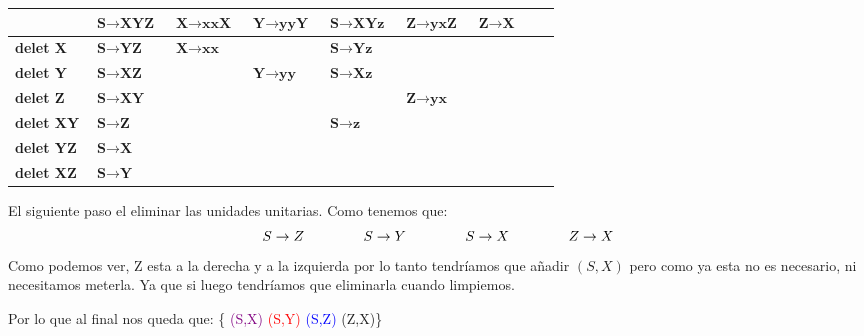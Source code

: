 \begin{table}[H]
	\centering
	\begin{tabular}{|m{2cm}||m{1.8cm}|m{1.8cm}|m{1.8cm}|m{1.8cm}|m{1.8cm}|m{1.8cm}|m{1.8cm}|m{1.8cm}|}
		\hline
		& $ \textbf{S} \rightarrow \textbf{XYZ} $ & $ \textbf{X} \rightarrow \textbf{xxX} $ & $ \textbf{Y} \rightarrow \textbf{yyY} $ & $ \textbf{S} \rightarrow \textbf{XYz} $ & $ \textbf{Z} \rightarrow \textbf{yxZ} $ & $ \textbf{Z} \rightarrow \textbf{X} $ \\
		\hline \hline
		\textbf{delet X} & $ \textbf{S} \rightarrow \textbf{YZ} $ & $ \textbf{X} \rightarrow \textbf{xx} $ &  & $ \textbf{S} \rightarrow \textbf{Yz} $ &  &  \\
		\hline
		\textbf{delet Y} & $ \textbf{S} \rightarrow \textbf{XZ} $ &  & $ \textbf{Y} \rightarrow \textbf{yy} $ & $ \textbf{S} \rightarrow \textbf{Xz} $ &  &  \\
		\hline
		\textbf{delet Z} & $ \textbf{S} \rightarrow \textbf{XY} $ &  &  &  & $ \textbf{Z} \rightarrow \textbf{yx} $ &  \\
		\hline
		\textbf{delet XY} & $ \textbf{S} \rightarrow \textbf{Z} $ &  &  & $ \textbf{S} \rightarrow \textbf{z} $ &  &  \\
		\hline
		\textbf{delet YZ} & $ \textbf{S} \rightarrow \textbf{X} $ &  &  &  &  &  \\
		\hline
		\textbf{delet XZ} & $ \textbf{S} \rightarrow \textbf{Y} $ &  &  &  &  &  \\
		\hline
	\end{tabular}
	\label{fig:tabla-prac-4C}
\end{table}

El siguiente paso el eliminar las unidades unitarias. Como tenemos que: \newline
$$ S \rightarrow Z \hspace{1.5cm} S \rightarrow Y \hspace{1.5cm} S \rightarrow X \hspace{1.5cm} Z \rightarrow X $$
Como podemos ver, Z esta a la derecha y a la izquierda por lo tanto tendríamos que añadir $ (S,X) $ pero como ya esta no es necesario, ni necesitamos meterla. Ya que si luego tendríamos que eliminarla cuando limpiemos. \newline

\newpage

Por lo que al final nos queda que: \{ \textcolor{purple}{(S,X)} \textcolor{red}{(S,Y)} \textcolor{blue}{(S,Z)} \textcolor{OliveGreen}{(Z,X)}\}

